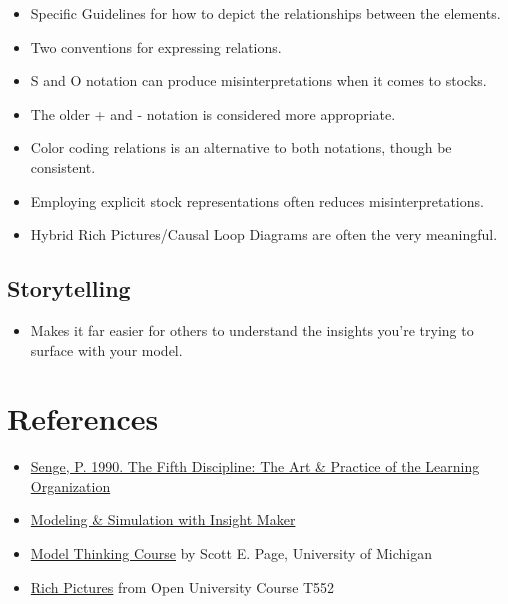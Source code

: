 \documentclass[]{memoir}
\begin{document}
\begin{itemize}
\itemsep1pt\parskip0pt
\item
  Specific Guidelines for how to depict the relationships between the
  elements.
\item
  Two conventions for expressing relations.
\item
  S and O notation can produce misinterpretations when it comes to
  stocks.
\item
  The older + and - notation is considered more appropriate.
\item
  Color coding relations is an alternative to both notations, though be
  consistent.
\item
  Employing explicit stock representations often reduces
  misinterpretations.
\item
  Hybrid Rich Pictures/Causal Loop Diagrams are often the very
  meaningful.
\end{itemize}

\subsection{Storytelling}

\begin{itemize}
\itemsep1pt\parskip0pt
\item
  Makes it far easier for others to understand the insights you're
  trying to surface with your model.
\end{itemize}

\section{References}

\begin{itemize}
\itemsep1pt\parskip0pt
\item
  \href{http://www.amazon.com/Fifth-Discipline-Practice-Organization-ebook/dp/B000SEIFKK/}{Senge,
  P. 1990. The Fifth Discipline: The Art \& Practice of the Learning
  Organization}
\item
  \href{http://www.systemswiki.org/index.php?title=Modeling_\%26_Simulation_with_Insight_Maker}{Modeling
  \& Simulation with Insight Maker}
\item
  \href{https://www.coursera.org/course/modelthinking}{Model Thinking
  Course} by Scott E. Page, University of Michigan
\item
  \href{http://systems.open.ac.uk/materials/T552/pages/rich/richAppendix.html}{Rich
  Pictures} from Open University Course T552
\end{itemize}
\end{document}
